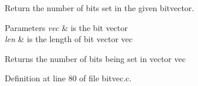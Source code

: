Return the number of bits set in the given bitvector. 


\begin{DoxyParams}{Parameters}
{\em vec} & is the bit vector \\
\hline
{\em len} & is the length of bit vector {\ttfamily vec} \\
\hline
\end{DoxyParams}
\begin{DoxyReturn}{Returns}
the number of bits being set in vector {\ttfamily vec} 
\end{DoxyReturn}


Definition at line 80 of file bitvec.\-c.


